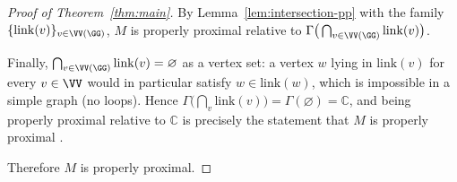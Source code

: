 \begin{proof}[Proof of Theorem~\ref{thm:main}]
By Lemma~\ref{lem:intersection-pp} with the family $\{\mathrm{link}(v)\}_{v\in\VV(\GG)}$, $M$
is properly proximal relative to $\Gamma\big(\bigcap_{v\in\VV(\GG)}\mathrm{link}(v)\big)$.

Finally, $\bigcap_{v\in\VV(\GG)}\mathrm{link}(v)=\varnothing$ as a vertex set: a vertex $w$
lying in $\mathrm{link}(v)$ for every $v\in\VV$ would in particular satisfy $w\in\mathrm{link}(w)$,
which is impossible in a simple graph (no loops). Hence
$\Gamma\big(\bigcap_v\mathrm{link}(v)\big)=\Gamma(\varnothing)=\mathbb C$, and being properly
proximal relative to $\mathbb C$ is precisely the statement that $M$ is properly proximal
\cite[\S8]{DKEP23}.

Therefore $M$ is properly proximal.
\end{proof}